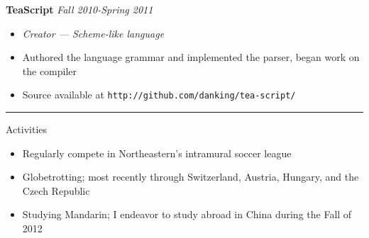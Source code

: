 \documentclass[10pt]{letter}
\begin{document}
\begin{tabbing}
{\large \bf TeaScript} \` \textit{Fall 2010-Spring 2011}
\end{tabbing}

\begin{itemize}
\setlength\itemsep{1pt}
\item [] {\textit{Creator --- Scheme-like language}}
\item{Authored the language grammar and implemented the parser, began work on
  the compiler}
\item{Source available at \texttt{http://github.com/danking/tea-script/}}
\end{itemize}

\rule{\linewidth}{.5pt}

{\Large Activities}
\begin{itemize}
\setlength\itemsep{1pt}
\item{Regularly compete in Northeastern's intramural soccer league}
\item{Globetrotting; most recently through Switzerland, Austria, Hungary, and
  the Czech Republic}
\item{Studying Mandarin; I endeavor to study abroad in China during the Fall of
  2012}
\end{itemize} 
\end{document}
